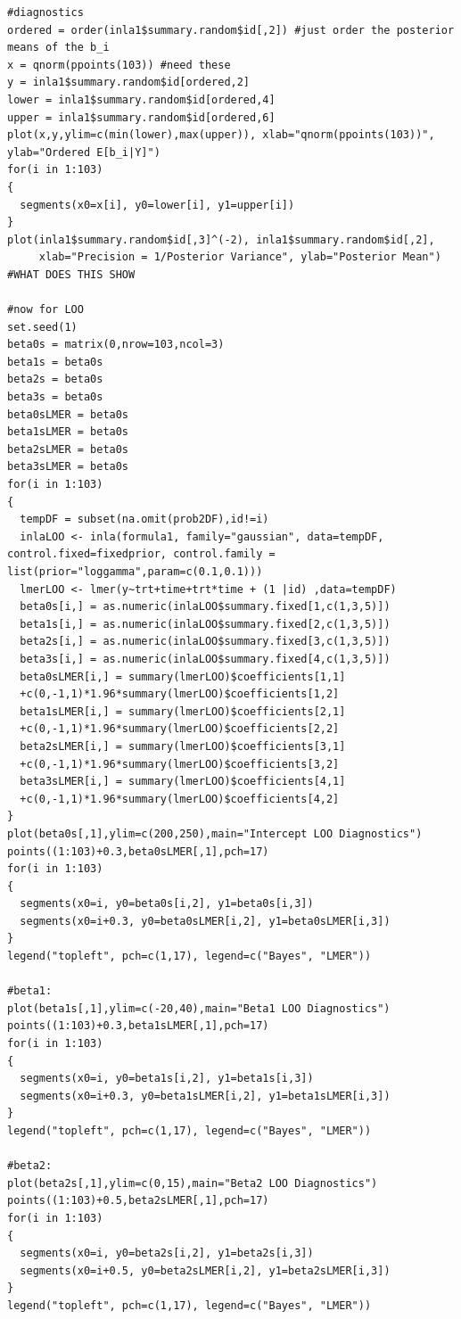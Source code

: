 \documentclass[11pt]{article}
\begin{document}
\begin{verbatim}
#diagnostics
ordered = order(inla1$summary.random$id[,2]) #just order the posterior means of the b_i
x = qnorm(ppoints(103)) #need these
y = inla1$summary.random$id[ordered,2]
lower = inla1$summary.random$id[ordered,4]
upper = inla1$summary.random$id[ordered,6]
plot(x,y,ylim=c(min(lower),max(upper)), xlab="qnorm(ppoints(103))", ylab="Ordered E[b_i|Y]")
for(i in 1:103)
{
  segments(x0=x[i], y0=lower[i], y1=upper[i])
}
plot(inla1$summary.random$id[,3]^(-2), inla1$summary.random$id[,2],
     xlab="Precision = 1/Posterior Variance", ylab="Posterior Mean") #WHAT DOES THIS SHOW

#now for LOO
set.seed(1)
beta0s = matrix(0,nrow=103,ncol=3)
beta1s = beta0s
beta2s = beta0s
beta3s = beta0s
beta0sLMER = beta0s
beta1sLMER = beta0s
beta2sLMER = beta0s
beta3sLMER = beta0s
for(i in 1:103)
{
  tempDF = subset(na.omit(prob2DF),id!=i)
  inlaLOO <- inla(formula1, family="gaussian", data=tempDF, control.fixed=fixedprior, control.family = list(prior="loggamma",param=c(0.1,0.1)))
  lmerLOO <- lmer(y~trt+time+trt*time + (1 |id) ,data=tempDF)
  beta0s[i,] = as.numeric(inlaLOO$summary.fixed[1,c(1,3,5)])
  beta1s[i,] = as.numeric(inlaLOO$summary.fixed[2,c(1,3,5)])
  beta2s[i,] = as.numeric(inlaLOO$summary.fixed[3,c(1,3,5)])
  beta3s[i,] = as.numeric(inlaLOO$summary.fixed[4,c(1,3,5)])
  beta0sLMER[i,] = summary(lmerLOO)$coefficients[1,1]
  +c(0,-1,1)*1.96*summary(lmerLOO)$coefficients[1,2]
  beta1sLMER[i,] = summary(lmerLOO)$coefficients[2,1]
  +c(0,-1,1)*1.96*summary(lmerLOO)$coefficients[2,2]
  beta2sLMER[i,] = summary(lmerLOO)$coefficients[3,1]
  +c(0,-1,1)*1.96*summary(lmerLOO)$coefficients[3,2]
  beta3sLMER[i,] = summary(lmerLOO)$coefficients[4,1]
  +c(0,-1,1)*1.96*summary(lmerLOO)$coefficients[4,2]
}
plot(beta0s[,1],ylim=c(200,250),main="Intercept LOO Diagnostics")
points((1:103)+0.3,beta0sLMER[,1],pch=17)
for(i in 1:103)
{
  segments(x0=i, y0=beta0s[i,2], y1=beta0s[i,3])
  segments(x0=i+0.3, y0=beta0sLMER[i,2], y1=beta0sLMER[i,3])
}
legend("topleft", pch=c(1,17), legend=c("Bayes", "LMER"))

#beta1:
plot(beta1s[,1],ylim=c(-20,40),main="Beta1 LOO Diagnostics")
points((1:103)+0.3,beta1sLMER[,1],pch=17)
for(i in 1:103)
{
  segments(x0=i, y0=beta1s[i,2], y1=beta1s[i,3])
  segments(x0=i+0.3, y0=beta1sLMER[i,2], y1=beta1sLMER[i,3])
}
legend("topleft", pch=c(1,17), legend=c("Bayes", "LMER"))

#beta2:
plot(beta2s[,1],ylim=c(0,15),main="Beta2 LOO Diagnostics")
points((1:103)+0.5,beta2sLMER[,1],pch=17)
for(i in 1:103)
{
  segments(x0=i, y0=beta2s[i,2], y1=beta2s[i,3])
  segments(x0=i+0.5, y0=beta2sLMER[i,2], y1=beta2sLMER[i,3])
}
legend("topleft", pch=c(1,17), legend=c("Bayes", "LMER"))


\end{verbatim}
\end{document}

